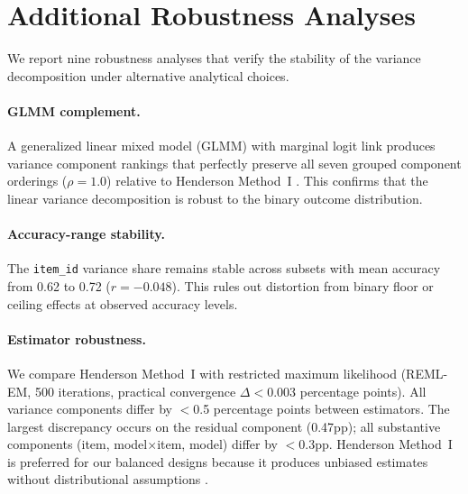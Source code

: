 \appendix

\section{Additional Robustness Analyses}
\label{app:robustness}

We report nine robustness analyses that verify the stability of the variance decomposition under alternative analytical choices.

\paragraph{GLMM complement.} A generalized linear mixed model (GLMM) with marginal logit link produces variance component rankings that perfectly preserve all seven grouped component orderings ($\rho = 1.0$) relative to Henderson Method~I \cite{jiang2018bayesian, tuerlinckx2006glmm}. This confirms that the linear variance decomposition is robust to the binary outcome distribution.

\paragraph{Accuracy-range stability.} The \texttt{item\_id} variance share remains stable across subsets with mean accuracy from 0.62 to 0.72 ($r = -0.048$). This rules out distortion from binary floor or ceiling effects at observed accuracy levels.

\paragraph{Estimator robustness.} We compare Henderson Method~I with restricted maximum likelihood (REML-EM, 500 iterations, practical convergence $\Delta < 0.003$ percentage points). All variance components differ by $<$0.5 percentage points between estimators. The largest discrepancy occurs on the residual component (0.47pp); all substantive components (item, model$\times$item, model) differ by $<$0.3pp. Henderson Method~I is preferred for our balanced designs because it produces unbiased estimates without distributional assumptions \cite[Ch.~12]{brennan2001generalizability}.

